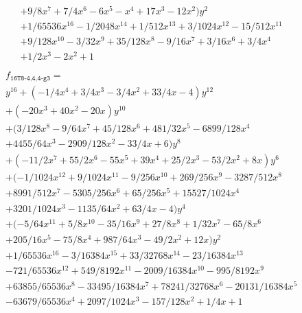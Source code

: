 \documentclass{dcthesis}
\numberwithin{equation}{section}
\theoremstyle{definition}
\theoremstyle{remark}
\begin{document}
{{{\begin{align}
\begin{split}
        &+ 9/8x^7 + 7/4x^6 - 6x^5 - x^4 + 17x^3 - 12x^2)y^2\\
        &+ 1/65536x^{16} - 1/2048x^{14} + 1/512x^{13} + 3/1024x^{12} - 15/512x^{11}\\
        &+ 9/128x^{10} - 3/32x^9 + 35/128x^8 - 9/16x^7 + 3/16x^6 + 3/4x^4\\
        &+ 1/2x^3 - 2x^2 + 1
      \end{split}
    \end{align}
    \begin{align}
      \label{eqn:d16t8_444}
      \begin{split}
        &f_{\texttt{16T8-4,4,4-g3}}=\\
        &y^{16} + (-1/4x^4 + 3/4x^3 - 3/4x^2 + 33/4x - 4)y^{12}\\
        &+ (-20x^3 + 40x^2 - 20x)y^{10}\\
        &+ (3/128x^8 - 9/64x^7 + 45/128x^6 + 481/32x^5 - 6899/128x^4\\
        &+ 4455/64x^3 - 2909/128x^2 - 33/4x + 6)y^8\\
        &+ (-11/2x^7 + 55/2x^6 - 55x^5 + 39x^4 + 25/2x^3 - 53/2x^2 + 8x)y^6\\
        &+ (-1/1024x^{12} + 9/1024x^{11} - 9/256x^{10} + 269/256x^9 - 3287/512x^8\\
        &+ 8991/512x^7 - 5305/256x^6 + 65/256x^5 + 15527/1024x^4\\
        &+ 3201/1024x^3 - 1135/64x^2 + 63/4x - 4)y^4\\
        &+ (-5/64x^{11} + 5/8x^{10} - 35/16x^9 + 27/8x^8 + 1/32x^7 - 65/8x^6\\
        &+ 205/16x^5 - 75/8x^4 + 987/64x^3 - 49/2x^2 + 12x)y^2\\
        &+ 1/65536x^{16} - 3/16384x^{15} + 33/32768x^{14} - 23/16384x^{13}\\
        &- 721/65536x^{12} + 549/8192x^{11} - 2009/16384x^{10} - 995/8192x^9\\
        &+ 63855/65536x^8 - 33495/16384x^7 + 78241/32768x^6 - 20131/16384x^5\\
        &- 63679/65536x^4 + 2097/1024x^3 - 157/128x^2 + 1/4x + 1
      \end{split}
    \end{align}
  }
}}
\end{document}
